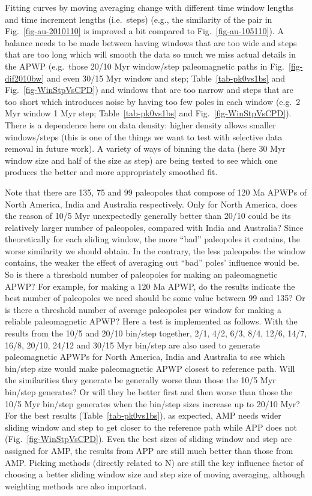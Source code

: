 Fitting curves by moving averaging change with different time window lengths and
time increment lengths (i.e.\ steps) (e.g., the similarity of the pair in
Fig.~\ref{fig-au-2010110} is improved a bit compared to
Fig.~\ref{fig-au-105110}). A balance needs to be made between having windows
that are too wide and steps that are too long which will smooth the data so much
we miss actual details in the APWP (e.g.\ those 20/10 Myr window/step
paleomagnetic paths in Fig.~\ref{fig-dif2010bw} and even 30/15 Myr window and
step; Table~\ref{tab-pk0vs1bs} and Fig.~\ref{fig-WinStpVsCPD}) and windows that
are too narrow and steps that are too short which introduces noise by having too
few poles in each window (e.g.\ 2 Myr window 1 Myr step;
Table~\ref{tab-pk0vs1bs} and Fig.~\ref{fig-WinStpVsCPD}). There is a dependence
here on data density: higher density allows smaller windows/steps (this is one
of the things we want to test with selective data removal in future work). A
variety of ways of binning the data (here 30 Myr window size and
half of the size as step) are being tested to see which one produces the better
and more appropriately smoothed fit.

Note that there are 135, 75 and 99 paleopoles that compose of 120 Ma
APWPs of North America, India and Australia respectively. Only for North
America, does the reason of 10/5 Myr unexpectedly generally better than 20/10
could be its relatively larger number of paleopoles, compared with India and
Australia? Since theoretically for each sliding window, the more ``bad''
paleopoles it contains, the worse similarity we should obtain. In the contrary,
the less paleopoles the window contains, the weaker the effect of averaging out
``bad'' poles' influence would be. So is there a threshold number of paleopoles
for making an paleomagnetic APWP\@? For example, for making a 120 Ma
APWP, do the results indicate the best number of paleopoles we need should be
some value between 99 and 135? Or is there a threshold number of average
paleopoles per window for making a reliable paleomagnetic APWP\@? Here a test is
implemented as follows. With the results from the 10/5 and 20/10 bin/step
together, 2/1, 4/2, 6/3, 8/4, 12/6, 14/7, 16/8, 20/10, 24/12 and 30/15 Myr
bin/step are also used to generate paleomagnetic APWPs for North America, India
and Australia to see which bin/step size would make paleomagnetic APWP closest
to reference path. Will the similarities they generate be generally worse than
those the 10/5 Myr bin/step generates? Or will they be better first and then
worse than those the 10/5 Myr bin/step generates when the bin/step sizes
increase up to 20/10 Myr? For the best results (Table~\ref{tab-pk0vs1bs}), as
expected, AMP needs wider sliding window and step to get closer to the reference
path while APP does not
(Fig.~\ref{fig-WinStpVsCPD}). Even the best sizes of sliding window and step are
assigned for AMP, the results from APP are still much better than those from
AMP\@. Picking methods (directly related to N) are still the key influence
factor of choosing a better sliding window size and step size of moving
averaging, although weighting methods are also important.


